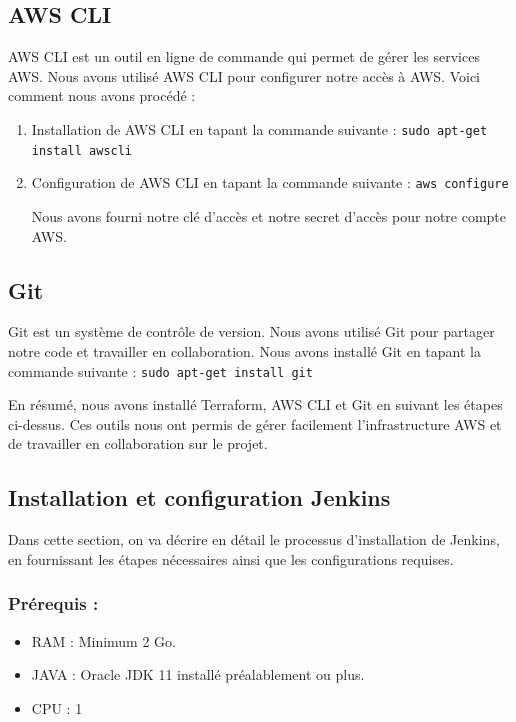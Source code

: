 \subsection*{AWS CLI}

AWS CLI est un outil en ligne de commande qui permet de gérer les services AWS. Nous avons utilisé AWS CLI pour configurer notre accès à AWS. Voici comment nous avons procédé :

\begin{enumerate}
\item Installation de AWS CLI en tapant la commande suivante :  
\texttt{sudo apt-get install awscli}

\item Configuration de AWS CLI en tapant la commande suivante :  
\texttt{aws configure}  

Nous avons fourni notre clé d’accès et notre secret d’accès pour notre compte AWS.
\end{enumerate}

\subsection*{Git}

Git est un système de contrôle de version. Nous avons utilisé Git pour partager notre code et travailler en collaboration. Nous avons installé Git en tapant la commande suivante :  
\texttt{sudo apt-get install git}

En résumé, nous avons installé Terraform, AWS CLI et Git en suivant les étapes ci-dessus. Ces outils nous ont permis de gérer facilement l’infrastructure AWS et de travailler en collaboration sur le projet.

\subsection*{Installation et configuration Jenkins}

Dans cette section, on va décrire en détail le processus d’installation de Jenkins, en fournissant les étapes nécessaires ainsi que les configurations requises.

\subsubsection*{Prérequis :}

\begin{itemize}
\item RAM : Minimum 2 Go.
\item JAVA : Oracle JDK 11 installé préalablement ou plus.
\item CPU : 1
\end{itemize}

